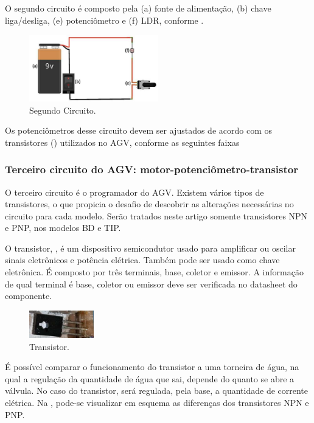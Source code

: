 \documentclass{textolivre}
\begin{document}
O segundo circuito é composto pela (a) fonte de alimentação, (b) chave
liga/desliga, (e) potenciômetro e (f) LDR, conforme .

\begin{figure}[htbp]
\centering
\includegraphics[width=0.5\textwidth]{figure-16.pdf}
\caption{Segundo Circuito.}
\label{fig10}
\end{figure}

Os potenciômetros desse circuito devem ser ajustados de acordo com os
transistores () utilizados no AGV, conforme as seguintes faixas


\FloatBarrier 

\subsubsection{Terceiro circuito do AGV: motor-potenciômetro-transistor}\label{sec-terceiro-circ}
O terceiro circuito é o programador do AGV. Existem vários tipos de
transistores, o que propicia o desafio de descobrir as alterações necessárias
no circuito para cada modelo. Serão tratados neste artigo somente transistores
NPN e PNP, nos modelos BD e TIP.

O transistor, , é um dispositivo semicondutor usado para amplificar ou
oscilar sinais eletrônicos e potência elétrica. Também pode ser usado como
chave eletrônica. É composto por três terminais, base, coletor e emissor. A
informação de qual terminal é base, coletor ou emissor deve ser verificada no
datasheet do componente.

\begin{figure}[htbp]
\centering
\includegraphics[width=0.25\textwidth]{figure-17.pdf}
\caption{Transistor.}
\label{fig11}
\end{figure}

É possível comparar o funcionamento do transistor a uma torneira de água, na
qual a regulação da quantidade de água que sai, depende do quanto se abre a
válvula. No caso do transistor, será regulada, pela base, a quantidade de
corrente elétrica. Na , pode-se visualizar em esquema as diferenças
dos transistores NPN e PNP.
\end{document}
